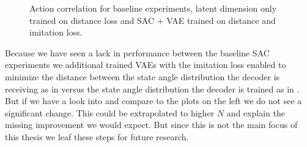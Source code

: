 \begin{figure}
    \begin{center}
        \hfill
    \end{center}
    \caption[action correlation comparison]{Action correlation for baseline experiments, latent dimension only trained on distance loss and SAC + VAE trained on distance and imitation loss. }
    \label{fig:SAC_action_correlation_comp}
\end{figure}

Because we have seen a lack in performance between the baseline SAC experiments we additional trained VAEs with the imitation loss enabled to minimize the distance between the state angle distribution the decoder is receiving as in  versus the state angle distribution the decoder is trained as in . But if we have a look into  and compare to the plots on the left we do not see a significant change. This could be extrapolated to higher $N$ and explain the missing improvement we would expect. But since this is not the main focus of this thesis we leaf these steps for future research.

